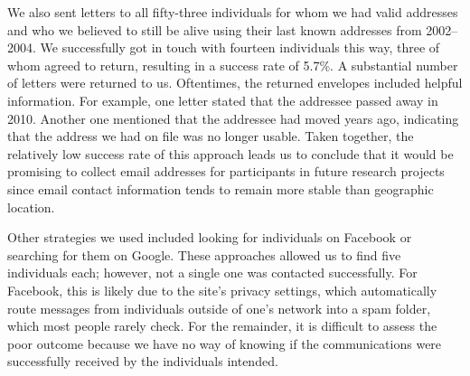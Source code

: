 \documentclass[output=paper]{langscibook}
\begin{document}
We also sent letters to all fifty-three individuals for whom we had valid addresses and who we believed to still be alive using their last known addresses from 2002--2004. We successfully got in touch with fourteen individuals this way, three of whom agreed to return, resulting in a success rate of 5.7\%.
A substantial number of letters were returned to us. Oftentimes, the returned envelopes included helpful information. For example, one letter stated that the addressee passed away in 2010. Another one mentioned that the addressee had moved years ago, indicating that the address we had on file was no longer usable. Taken together, the relatively low success rate of this approach leads us to conclude that it would be promising to collect email addresses for participants in future research projects since email contact information tends to remain more stable than geographic location.

Other strategies we used included looking for individuals on Facebook or searching for them on Google. These approaches allowed us to find five individuals each; however, not a single one was contacted successfully. For Facebook, this is likely due to the site’s privacy settings, which automatically route messages from individuals outside of one’s network into a spam folder, which most people rarely check. For the remainder, it is difficult to assess the poor outcome because we have no way of knowing if the communications were successfully received by the individuals intended.
\end{document}

